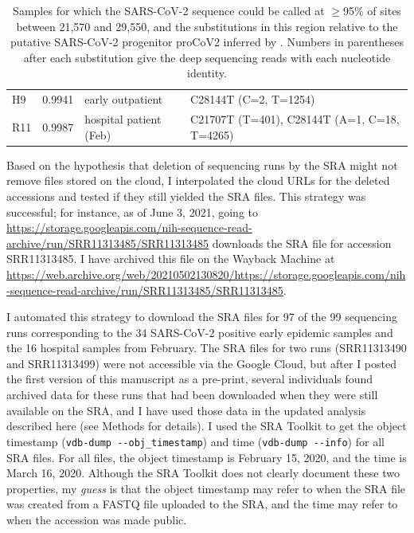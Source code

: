 \documentclass[9pt,twocolumn,twoside]{gsajnl_modified}
\begin{document}
\begin{table}[b!]
{\begin{tabular}{lrll}
H9 &                               0.9941 &        early outpatient &                                                     C28144T (C=2, T=1254)  \\
R11 &                               0.9987 &  hospital patient (Feb) &                               C21707T (T=401), C28144T (A=1, C=18, T=4265)  \\
\bottomrule
\end{tabular}
}
\caption{Samples for which the SARS-CoV-2 sequence could be called at $\ge$95\% of sites between 21,570 and 29,550, and the substitutions in this region relative to the putative SARS-CoV-2 progenitor proCoV2 inferred by \citet{kumar2021evolutionary}.
Numbers in parentheses after each substitution give the deep sequencing reads with each nucleotide identity.
\label{tab:mutations}
}
\end{table}

Based on the hypothesis that deletion of sequencing runs by the SRA might not remove files stored on the cloud, I interpolated the cloud URLs for the deleted accessions and tested if they still yielded the SRA files.
This strategy was successful; for instance, as of June 3, 2021, going to \url{https://storage.googleapis.com/nih-sequence-read-archive/run/SRR11313485/SRR11313485} downloads the SRA file for accession SRR11313485.
I have archived this file on the Wayback Machine at \url{https://web.archive.org/web/20210502130820/https://storage.googleapis.com/nih-sequence-read-archive/run/SRR11313485/SRR11313485}.

I automated this strategy to download the SRA files for 97 of the 99 sequencing runs corresponding to the 34 SARS-CoV-2 positive early epidemic samples and the 16 hospital samples from February.
The SRA files for two runs (SRR11313490 and SRR11313499) were not accessible via the Google Cloud, but after I posted the first version of this manuscript as a pre-print, several individuals found archived data for these runs that had been downloaded when they were still available on the SRA, and I have used those data in the updated analysis described here (see Methods for details).
I used the SRA Toolkit to get the object timestamp (\texttt{vdb-dump -{}-obj\_timestamp}) and time (\texttt{vdb-dump -{}-info}) for all SRA files.
For all files, the object timestamp is February 15, 2020, and the time is March 16, 2020.
Although the SRA Toolkit does not clearly document these two properties, my \emph{guess} is that the object timestamp may refer to when the SRA file was created from a FASTQ file uploaded to the SRA, and the time may refer to when the accession was made public.
\end{document}
